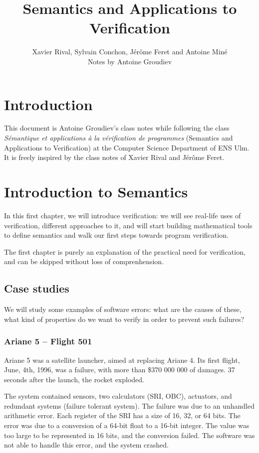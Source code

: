 \documentclass[toc]{../cs-classes/cs-classes}
\author{Xavier Rival, Sylvain Conchon, Jérôme Feret and Antoine Miné\\ Notes by Antoine Groudiev}
\title{Semantics and Applications to Verification}
\begin{document}
\section*{Introduction}
This document is Antoine Groudiev's class notes while following the class \emph{Sémantique et applications à la vérification de programmes} (Semantics and Applications to Verification) at the Computer Science Department of ENS Ulm. It is freely inspired by the class notes of Xavier Rival and Jérôme Feret. 

\section{Introduction to Semantics}
In this first chapter, we will introduce verification: we will see real-life uses of verification, different approaches to it, and will start building mathematical tools to define semantics and walk our first steps towards program verification.

The first chapter is purely an explanation of the practical need for verification, and can be skipped without loss of comprenhension.
\subsection{Case studies}
We will study some examples of software errors: what are the causes of these, what kind of properties do we want to verify in order to prevent such failures?
\subsubsection{Ariane 5 -- Flight 501}
Ariane 5 was a satellite launcher, aimed at replacing Ariane 4. Its first flight, June, 4th, 1996, was a failure, with more than \$370 000 000 of damages. 37 seconds after the launch, the rocket exploded. 

The system contained sensors, two calculators (SRI, OBC), actuators, and redundant systems (failure tolerant system). The failure was due to an unhandled arithmetic error. Each register of the  SRI has a size of 16, 32, or 64 bits. The error was due to a conversion of a 64-bit float to a 16-bit integer. The value was too large to be represented in 16 bits, and the conversion failed. The software was not able to handle this error, and the system crashed.
\end{document}
